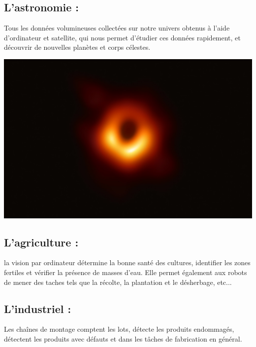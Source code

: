 \subsection{L’astronomie :}
Tous les données volumineuses collectées sur notre univers obtenus à l’aide d’ordinateur et satellite, qui nous permet d’étudier ces données rapidement, et découvrir de nouvelles planètes et corps célestes.

\begin{center}
    \includegraphics[scale=0.25]{img6.png}
    \label{fig3}
\end{center} 

\subsection{L’agriculture :}
la vision par ordinateur détermine la bonne santé des cultures, identifier les zones fertiles et vérifier la présence de masses d’eau. Elle permet également aux robots de mener des taches tels que la récolte, la plantation et  le désherbage, etc...\\

\subsection{L’industriel :}
Les chaînes de montage comptent les lots, détecte les produits endommagés, détectent les produits avec défauts et dans les tâches de fabrication en général.\\

